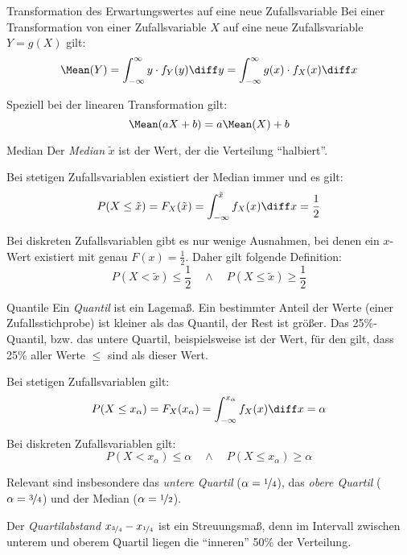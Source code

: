 \begin{algo}{Transformation des Erwartungswertes auf eine neue Zufallsvariable}
    Bei einer Transformation von einer Zufallsvariable $X$ auf eine neue Zufallsvariable $Y = g(X)$ gilt:
    \[
        \Mean(Y) = \int_{-\infty}^{\infty} y \cdot f_Y(y) \diff y = \int_{-\infty}^{\infty} g(x) \cdot f_X(x) \diff x
    \]

    Speziell bei der linearen Transformation gilt:
    \[
        \Mean(aX + b) = a \Mean(X) + b
    \]
\end{algo}

\begin{defi}{Median}
    Der \emph{Median} $\tilde{x}$ ist der Wert, der die Verteilung \enquote{halbiert}.

    Bei stetigen Zufallsvariablen existiert der Median immer und es gilt:
    \[
        P(X \leq \tilde{x}) = F_X(\tilde{x}) = \int_{-\infty}^{\tilde{x}} f_X(x) \diff x = \frac{1}{2}
    \]

    Bei diskreten Zufallsvariablen gibt es nur wenige Ausnahmen, bei denen ein $x$-Wert existiert mit genau $F(x) = \frac{1}{2}$.
    Daher gilt folgende Definition:
    \[
        P(X < \tilde{x}) \leq \frac{1}{2} \quad \land \quad P(X \leq \tilde{x}) \geq \frac{1}{2}
    \]
\end{defi}

\begin{defi}{Quantile}
    Ein \emph{Quantil} ist ein Lagemaß.
    Ein bestimmter Anteil der Werte (einer Zufallsstichprobe) ist kleiner als das Quantil, der Rest ist größer.
    Das 25\%-Quantil, bzw. das untere Quartil, beispielsweise ist der Wert, für den gilt, dass 25\% aller Werte $\leq$ sind als dieser Wert.

    Bei stetigen Zufallsvariablen gilt:
    \[
        P(X \leq x_\alpha) = F_X(x_\alpha) = \int_{-\infty}^{x_\alpha} f_X(x) \diff x = \alpha
    \]

    Bei diskreten Zufallsvariablen gilt:
    \[
        P(X < x_\alpha) \leq \alpha \quad \land \quad P(X \leq x_\alpha) \geq \alpha
    \]

    Relevant sind insbesondere das \emph{untere Quartil} ($\alpha = \nicefrac{1}{4}$), das \emph{obere Quartil} ($\alpha = \nicefrac{3}{4}$) und der Median ($\alpha = \nicefrac{1}{2}$).

    Der \emph{Quartilabstand} $x_{\nicefrac{3}{4}} - x_{\nicefrac{1}{4}}$ ist ein Streuungsmaß, denn im Intervall zwischen unterem und oberem Quartil liegen die \enquote{inneren} 50\% der Verteilung.
\end{defi}

